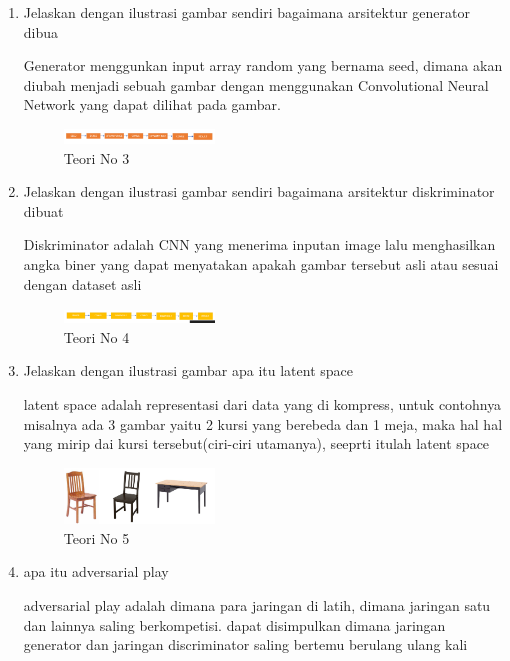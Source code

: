 \begin{enumerate}
            \item Jelaskan dengan ilustrasi gambar sendiri bagaimana arsitektur generator dibua
            \par Generator menggunkan input array random yang bernama seed, dimana akan diubah menjadi sebuah gambar dengan menggunakan Convolutional Neural Network yang dapat dilihat pada gambar.
            \begin{figure}[H]
                \includegraphics[width=4cm]{figures/1174086/chapter8/teori3.png}
                \centering
                  \caption{Teori No 3}
            \end{figure}

            \item Jelaskan dengan ilustrasi gambar sendiri bagaimana arsitektur diskriminator dibuat
            \par Diskriminator adalah CNN yang menerima inputan image lalu menghasilkan angka biner yang dapat menyatakan apakah gambar tersebut asli atau sesuai dengan dataset asli
            \begin{figure}[H]
                \includegraphics[width=4cm]{figures/1174086/chapter8/teori4.png}
                \centering
                  \caption{Teori No 4}
            \end{figure}

            \item Jelaskan dengan ilustrasi gambar apa itu latent space
            \par latent space adalah representasi dari data yang di kompress, untuk contohnya misalnya ada 3 gambar yaitu 2 kursi yang berebeda dan 1 meja, maka hal hal yang mirip dai kursi tersebut(ciri-ciri utamanya), seeprti itulah latent space
            \begin{figure}[H]
                \includegraphics[width=4cm]{figures/1174086/chapter8/teori5.png}
                \centering
                  \caption{Teori No 5}
            \end{figure}

            \item apa itu adversarial play
            \par adversarial play adalah dimana para jaringan di latih, dimana jaringan satu dan lainnya saling berkompetisi. dapat disimpulkan dimana jaringan generator dan jaringan discriminator saling bertemu berulang ulang kali
            

\end{enumerate}
